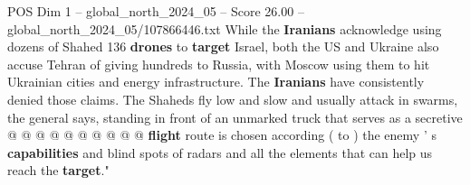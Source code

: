 \begin{textsample}{POS Dim 1 – global\_north\_2024\_05 – Score 26.00 – global\_north\_2024\_05/107866446.txt}
While the \textbf{Iranians} acknowledge using dozens of Shahed 136 \textbf{drones} to \textbf{target} Israel, both the US and Ukraine also accuse Tehran of giving hundreds to Russia, with Moscow using them to hit Ukrainian cities and energy infrastructure.
The \textbf{Iranians} have consistently denied those claims.
The Shaheds fly low and slow and usually attack in swarms, the general says, standing in front of an unmarked truck that serves as a secretive @ @ @ @ @ @ @ @ @ @ \textbf{flight} route is chosen according ( to ) the enemy ' s \textbf{capabilities} and blind spots of radars and all the elements that can help us reach the \textbf{target}."

\end{textsample}
